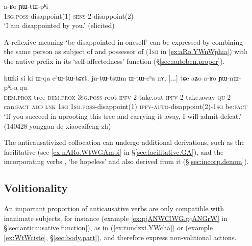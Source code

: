 \begin{exe}
\ex \label{ex:aRo.YWtWphi}
\gll a-ʁo ɲɯ-tɯ-pʰi \\
 \textsc{1sg}.\textsc{poss}-disappoint(1) \textsc{sens}-2-disappoint(2) \\
 \glt `I am disappointed by you.' (elicited)
\end{exe}

A reflexive meaning `be disappointed in oneself'  can be expressed by combining the same person as subject of  and possessor of   (\textsc{1sg} in  \ref{ex:aRo.YWnWphia}) with the autive prefix  in its `self-affectedness' function (§\ref{sec:autoben.proper}).

 \begin{exe}
\ex \label{ex:aRo.YWnWphia}
\gll kɯki si ki ɯ-qa cʰɯ-tɯ-tɕɤt, ju-tɯ-tsɯm ɯ-tɯ-cʰa nɤ,  [...] tɕe aʑo a-ʁo ɲɯ-nɯ-pʰi-a ŋu  \\
\textsc{dem}.\textsc{prox} tree \textsc{dem}.\textsc{prox} \textsc{3sg}.\textsc{poss}-root \textsc{ipfv}-2-take.out \textsc{ipfv}-2-take.away \textsc{qu}-2-can:\textsc{fact} \textsc{add} {  } \textsc{lnk} \textsc{1sg} \textsc{1sg}.\textsc{poss}-disappoint(1) \textsc{ipfv}-\textsc{auto}-disappoint(2)-\textsc{1sg} be:\textsc{fact} \\
\glt `If you succeed in uprooting this tree and carrying it away, I will admit defeat.' (140428 yonggan de xiaocaifeng-zh)
\end{exe}

The anticausativized collocation  can undergo additional derivations, such as the facilitative (see \ref{ex:nARo.WtWGAmbi} in §\ref{sec:facilitative.GA}), and the incorporating verbs , `be hopeless' and  also derived from it (§\ref{sec:incorp.denom}).

\subsection{Volitionality} \label{sec:anticausative.volitionality} 
An important proportion of anticausative verbs are only compatible with inanimate subjects, for instance  (example \ref{ex:pjANWClWG.pjANGrW} in §\ref{sec:anticausative.function}),  as in (\ref{ex:tundzxi.YWcha}) or  (example \ref{ex:WtWciste}, §\ref{sec:body.part}), and therefore express non-volitional actions.

